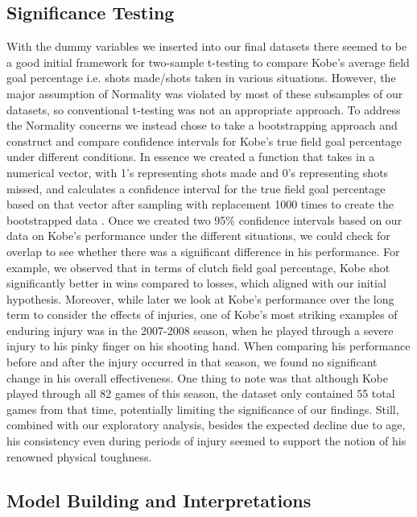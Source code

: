 \documentclass[paper=a4, fontsize=11pt]{scrartcl} %
\numberwithin{equation}{section} %
\numberwithin{figure}{section} %
\numberwithin{table}{section} %
\begin{document}
\subsection{Significance Testing}
\hspace*{1cm}With the dummy variables we inserted into our final datasets there seemed to be a good initial framework for two-sample t-testing to compare Kobe's average field goal percentage i.e. shots made/shots taken in various situations. However, the major assumption of Normality was violated by most of these subsamples of our datasets, so conventional t-testing was not an appropriate approach. To address the Normality concerns we instead chose to take a bootstrapping approach and construct and compare confidence intervals for Kobe's true field goal percentage under different conditions. In essence we created a function that takes in a numerical vector, with 1's representing shots made and 0's representing shots missed, and calculates a confidence interval for the true field goal percentage based on that vector after sampling with replacement 1000 times to create the bootstrapped data \cite{bootstraptheory}. Once we created two 95\% confidence intervals based on our data on Kobe's performance under the different situations, we could check for overlap to see whether there was a significant difference in his performance. For example, we observed that in terms of clutch field goal percentage, Kobe shot significantly better in wins compared to losses, which aligned with our initial hypothesis. Moreover, while later we look at Kobe's performance over the long term to consider the effects of injuries, one of Kobe's most striking examples of enduring injury was in the 2007-2008 season, when he played through a severe injury to his pinky finger on his shooting hand. When comparing his performance before and after the injury occurred in that season, we found no significant change in his overall effectiveness. One thing to note was that although Kobe played through all 82 games of this season, the dataset only contained 55 total games from that time, potentially limiting the significance of our findings. Still, combined with our exploratory analysis, besides the expected decline due to age, his consistency even during periods of injury seemed to support the notion of his renowned physical toughness.
\subsection{Model Building and Interpretations}
\end{document}

